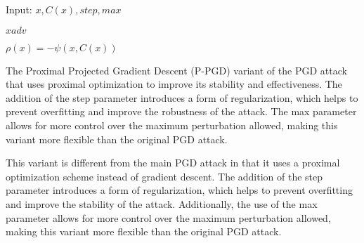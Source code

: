 Input: $x, C(x), step, max$

$xadv$

$\rho(x)=-\psi(x,C(x))$

The Proximal Projected Gradient Descent (P-PGD) variant of the PGD attack that uses proximal optimization to improve its stability and effectiveness. The addition of the step parameter introduces a form of regularization, which helps to prevent overfitting and improve the robustness of the attack. The max parameter allows for more control over the maximum perturbation allowed, making this variant more flexible than the original PGD attack.

This variant is different from the main PGD attack in that it uses a proximal optimization scheme instead of gradient descent. The addition of the step parameter introduces a form of regularization, which helps to prevent overfitting and improve the stability of the attack. Additionally, the use of the max parameter allows for more control over the maximum perturbation allowed, making this variant more flexible than the original PGD attack.